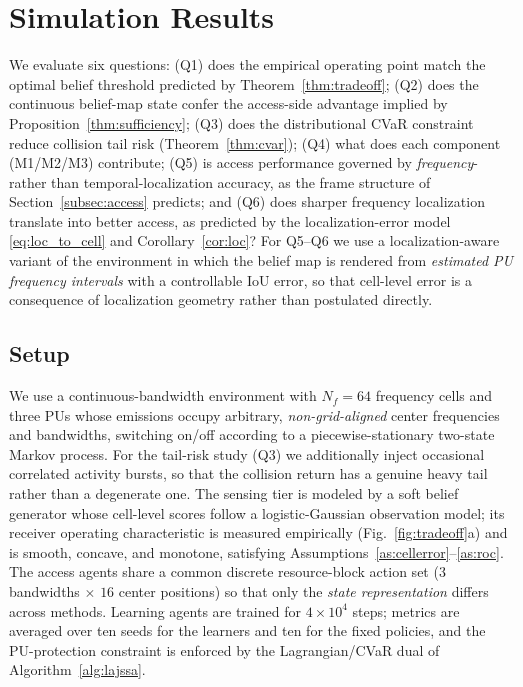 \documentclass[journal]{IEEEtran}
\newcommand{\Nf}{N_f}                      %
\begin{document}
\section{Simulation Results}
\label{sec:simulation}

We evaluate six questions: (Q1) does the empirical operating point match the
optimal belief threshold predicted by Theorem~\ref{thm:tradeoff}; (Q2) does
the continuous belief-map state confer the access-side advantage implied by
Proposition~\ref{thm:sufficiency}; (Q3) does the distributional CVaR
constraint reduce collision tail risk (Theorem~\ref{thm:cvar}); (Q4) what does
each component (M1/M2/M3) contribute; (Q5) is access performance governed by
\emph{frequency}- rather than temporal-localization accuracy, as the frame
structure of Section~\ref{subsec:access} predicts; and (Q6) does sharper
frequency localization translate into better access, as predicted by the
localization-error model \eqref{eq:loc_to_cell} and Corollary~\ref{cor:loc}?
For Q5--Q6 we use a localization-aware variant of the environment in which the
belief map is rendered from \emph{estimated PU frequency intervals} with a
controllable IoU error, so that cell-level error is a consequence of
localization geometry rather than postulated directly.

\subsection{Setup}
We use a continuous-bandwidth environment with $\Nf=64$ frequency cells and
three PUs whose emissions occupy arbitrary, \emph{non-grid-aligned} center
frequencies and bandwidths, switching on/off according to a
piecewise-stationary two-state Markov process. For the tail-risk study (Q3)
we additionally inject occasional correlated activity bursts, so that the
collision return has a genuine heavy tail rather than a degenerate one. The
sensing tier is modeled by a soft belief generator whose cell-level scores
follow a logistic-Gaussian observation model; its receiver operating
characteristic is measured empirically (Fig.~\ref{fig:tradeoff}a) and is
smooth, concave, and monotone, satisfying
Assumptions~\ref{as:cellerror}--\ref{as:roc}. The access agents share a common
discrete resource-block action set ($3$ bandwidths $\times$ $16$ center
positions) so that only the \emph{state representation} differs across
methods. Learning agents are trained for $4\times10^4$ steps; metrics are
averaged over ten seeds for the learners and ten for the fixed policies, and
the PU-protection constraint is enforced by the Lagrangian/CVaR dual of
Algorithm~\ref{alg:lajssa}.
\end{document}
